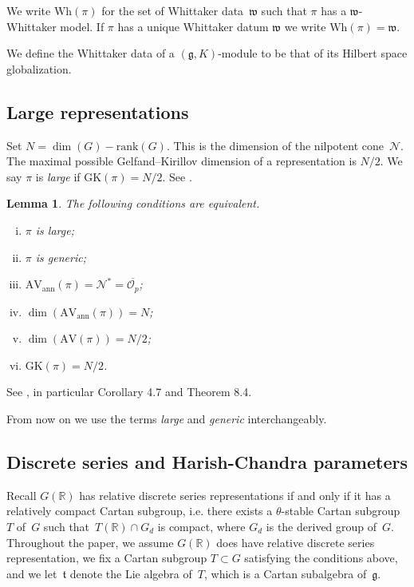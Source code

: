 \documentclass[cupthm]{CUP-JNL-JMJ}
\numberwithin{equation}{section}
\theoremstyle{cupplain}
\newtheorem{lemma}[theorem]{Lemma}
\theoremstyle{cupdefinition}
\theoremstyle{cupremark}
\theoremstyle{cupproof}
\renewcommand{\O}{\mathcal O}
\newcommand{\R}{\mathbb R}
\newcommand{\N}{\mathcal N}
\newcommand{\g}{\mathfrak g}
\newcommand{\w}{\mathfrak w}
\newcommand{\AV}{\mathrm{AV}}
\newcommand{\Wh}{\mathrm{Wh}}
\newcommand{\AVann}{\mathrm{AV}_{\mathrm{ann}}}
\newcommand{\GK}{\mathrm{GK}}
\newcommand{\Op}{\O_p}
\begin{document}
We write $\Wh(\pi)$ for the set of Whittaker data~$\w$ such that $\pi$ has a $\w$-Whittaker model.
If $\pi$ has a unique Whittaker datum $\w$ we write $\Wh(\pi)=\w$.

We define the Whittaker data  of a $(\g,K)$-module to be that of its 
Hilbert space globalization.


\subsection{Large representations} Set $N=\dim(G)-\mathrm{rank}(G)$. This is the dimension of the nilpotent cone~$\N$. The maximal possible Gelfand--Kirillov dimension of a representation is $N/2$.
We say $\pi$ is {\it large} if $\GK(\pi)=N/2$. See \cite[Section~6]{vogan-gelfand-kirillov}. 


\begin{lemma}
  \label{l:large}
  The following conditions are equivalent.
  \begin{enumerate}[(i)]
  \item $\pi$ is large\textup{;}
        \item $\pi$ is generic\textup{;}
\item $\AVann(\pi)=\N^*=\overline{\Op}$\textup{;}
\item $\dim(\AVann(\pi))=N$\textup{;}
  \item $\dim(\AV(\pi))=N/2$\textup{;}
  \item $\GK(\pi)=N/2$.
\end{enumerate}
\end{lemma}
See \cite{vogan_bowdoin}, in particular Corollary 4.7 and Theorem 8.4.

From now on we use the terms {\it large} and {\it generic} interchangeably.


\subsection{Discrete series and Harish-Chandra parameters} \label{sec:discrete_series}

Recall $G(\R)$ has relative discrete series representations if and only if it has a relatively compact Cartan subgroup, i.e. there exists a $\theta$-stable Cartan subgroup~$T$ of~$G$  such that~$T(\R) \cap G_d$ is  compact, where $G_d$ is the derived group of~$G$. Throughout the paper, we assume $G(\R)$ does have relative discrete series representation, we fix  a Cartan subgroup $T \subset G$ satisfying the conditions above, and we let~$\mathfrak{t}$ denote the Lie algebra of~$T$, which is a Cartan subalgebra of~$\g$. 
\end{document}
